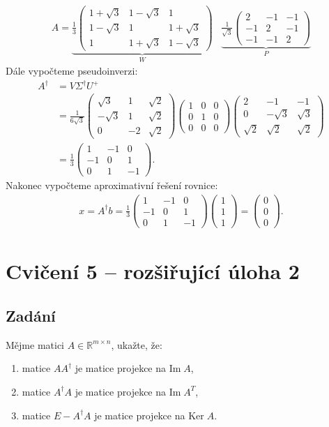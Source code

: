 \documentclass[]{article}
\newcommand{\Ker}{\mathrm{Ker}\;}
\renewcommand{\Im}{\mathrm{Im}\;}
\newcommand{\mat}[1]{\begin{pmatrix}#1\end{pmatrix}}
\newcommand{\recip}[1]{\frac{1}{#1}}
\newcommand{\recipsqrt}[1]{\frac{1}{\sqrt{#1}}}
\newcommand{\x}{\times}
\begin{document}
\begin{align*}
  A =
  \underbrace{
    \recip{3}
    \mat{
      1+\sqrt{3} & 1-\sqrt{3} & 1 \\
      1-\sqrt{3} & 1 & 1+\sqrt{3} \\
      1 & 1+\sqrt{3} & 1-\sqrt{3}
    }
  }_W
  \;\;\;
  \underbrace{
    \recipsqrt{3}
    \mat{
      2 & -1 & -1 \\
      -1 & 2 & -1 \\
      -1 & -1 & 2
    }
  }_P
\end{align*}
Dále vypočteme pseudoinverzi:
\begin{align*}
  A^\dagger
  &= V \Sigma^\dagger U^+ \\
  &= \recip{6\sqrt{3}}
  \mat{
    \sqrt{3} & 1 & \sqrt{2} \\
    -\sqrt{3} & 1 & \sqrt{2} \\
    0 & -2 & \sqrt{2}
  }
  \mat{1&0&0\\0&1&0\\0&0&0}
  \mat{
    2 & -1 & -1 \\
    0 & -\sqrt{3} & \sqrt{3} \\
    \sqrt{2} & \sqrt{2} & \sqrt{2}
  } \\
  &=
  \recip{3}
  \mat{
    1 & -1 & 0 \\
    -1 & 0 & 1 \\
    0 & 1 & -1
  }.
\end{align*}
Nakonec vypočteme aproximativní řešení rovnice:
\begin{align*}
  x = A^\dagger b = \recip{3}
  \mat{
    1 & -1 & 0 \\
    -1 & 0 & 1 \\
    0 & 1 & -1
  }
  \mat{1\\1\\1}
  = \mat{0\\0\\0}.
\end{align*}



\section{Cvičení 5 – rozšiřující úloha 2}
\subsection{Zadání}
Mějme matici $A \in \mathbb{R}^{m \x n}$, ukažte, že:
\begin{enumerate}
  \item matice $A A^\dagger$ je matice projekce na $\Im A$,
  \item matice $A^\dagger A$ je matice projekce na $\Im A^T$,
  \item matice $E - A^\dagger A$ je matice projekce na $\Ker A$.
\end{enumerate}
\end{document}
